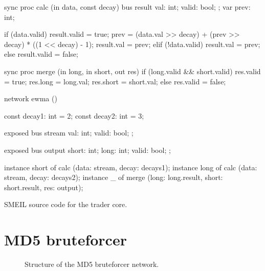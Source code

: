\begin{widefigure}
  \begin{smeilcode2}
sync proc calc (in data, const decay)
  bus result {
    val: int;
    valid: bool;
  };
  var prev: int;

{
  if (data.valid) {
    result.valid = true;
    prev = (data.val >> decay) +
      (prev >> decay) *
      ((1 << decay) - 1);
    result.val = prev;
  } elif (!data.valid) {
    result.val = prev;
  } else {
    result.valid = false;
  }
}

sync proc merge (in long,
                 in short, out res) {
  if (long.valid && short.valid) {
    res.valid = true;
    res.long = long.val;
    res.short = short.val;
  } else {
    res.valid = false;
  }
}

network ewma () {
  const decay1: int = 2;
  const decay2: int = 3;

  exposed bus stream {
    val: int;
    valid: bool;
  };

  exposed bus output {
    short: int;
    long: int;
    valid: bool;
  };

  instance short of calc 
      (data: stream, decay: decays1);
  instance long of calc
      (data: stream, decay: decays2);
  instance _ of merge
      (long: long.result,
       short: short.result,
       res: output);
}
\end{smeilcode2}
\caption{SMEIL source code for the trader core.}
\label{fig:tradesrc}

\end{widefigure}


\section{MD5 bruteforcer}
\label{sec:md5}
\begin{figure}%
  \centering
  \caption{Structure of the MD5 bruteforcer network.}
  \label{fig:md5net}
\end{figure}

